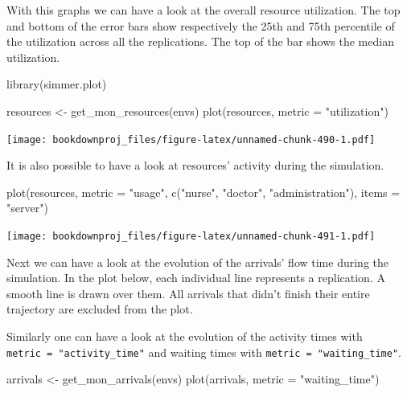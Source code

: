 \documentclass[
]{book}
\newenvironment{Shaded}{\begin{snugshade}}{\end{snugshade}}
\newcommand{\AttributeTok}[1]{\textcolor[rgb]{0.77,0.63,0.00}{#1}}
\newcommand{\FunctionTok}[1]{\textcolor[rgb]{0.00,0.00,0.00}{#1}}
\newcommand{\NormalTok}[1]{#1}
\newcommand{\OtherTok}[1]{\textcolor[rgb]{0.56,0.35,0.01}{#1}}
\newcommand{\StringTok}[1]{\textcolor[rgb]{0.31,0.60,0.02}{#1}}
\theoremstyle{definition}
\theoremstyle{definition}
\theoremstyle{definition}
\theoremstyle{definition}
\theoremstyle{remark}
\begin{document}
With this graphs we can have a look at the overall resource utilization. The top and bottom of the error bars show respectively the 25th and 75th percentile of the utilization across all the replications. The top of the bar shows the median utilization.

\begin{Shaded}
\begin{Highlighting}[]
\FunctionTok{library}\NormalTok{(simmer.plot)}

\NormalTok{resources }\OtherTok{\textless{}{-}} \FunctionTok{get\_mon\_resources}\NormalTok{(envs)}
\FunctionTok{plot}\NormalTok{(resources, }\AttributeTok{metric =} \StringTok{"utilization"}\NormalTok{)}
\end{Highlighting}
\end{Shaded}

\texttt{[image: bookdownproj\_files/figure-latex/unnamed-chunk-490-1.pdf]}

It is also possible to have a look at resources' activity during the simulation.

\begin{Shaded}
\begin{Highlighting}[]
\FunctionTok{plot}\NormalTok{(resources, }\AttributeTok{metric =} \StringTok{"usage"}\NormalTok{, }\FunctionTok{c}\NormalTok{(}\StringTok{"nurse"}\NormalTok{, }\StringTok{"doctor"}\NormalTok{, }\StringTok{"administration"}\NormalTok{), }\AttributeTok{items =} \StringTok{"server"}\NormalTok{)}
\end{Highlighting}
\end{Shaded}

\texttt{[image: bookdownproj\_files/figure-latex/unnamed-chunk-491-1.pdf]}

Next we can have a look at the evolution of the arrivals' flow time during the simulation. In the plot below, each individual line represents a replication. A smooth line is drawn over them. All arrivals that didn't finish their entire trajectory are excluded from the plot.

Similarly one can have a look at the evolution of the activity times with \texttt{metric\ =\ "activity\_time"} and waiting times with \texttt{metric\ =\ "waiting\_time"}.

\begin{Shaded}
\begin{Highlighting}[]
\NormalTok{arrivals }\OtherTok{\textless{}{-}} \FunctionTok{get\_mon\_arrivals}\NormalTok{(envs)}
\FunctionTok{plot}\NormalTok{(arrivals, }\AttributeTok{metric =} \StringTok{"waiting\_time"}\NormalTok{)}
\end{Highlighting}
\end{Shaded}
\end{document}
